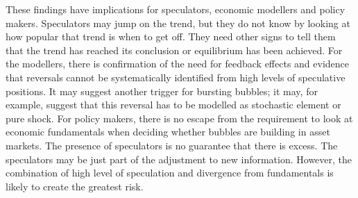\documentclass[12pt, a4paper, oneside]{article} %
\begin{document}
These findings have implications for speculators, economic modellers and policy makers.  Speculators may jump on the trend, but they do not know by looking at how popular that trend is when to get off.  They need other signs to tell them that the trend has reached its conclusion or equilibrium has been achieved.  For the modellers, there is confirmation of the need  for feedback effects and evidence that reversals cannot be systematically identified from high levels of speculative positions.  It may suggest another trigger for bursting bubbles; it may, for example, suggest that this reversal has to be modelled as stochastic element or pure shock. For policy makers, there is no escape from the requirement to look at economic fundamentals when deciding whether bubbles are building in asset markets.  The presence of speculators is no guarantee that there is excess.  The speculators may be just part of the adjustment to new information.   However, the combination of high level of speculation and divergence from fundamentals is likely to create the greatest risk. 


\end{document}
